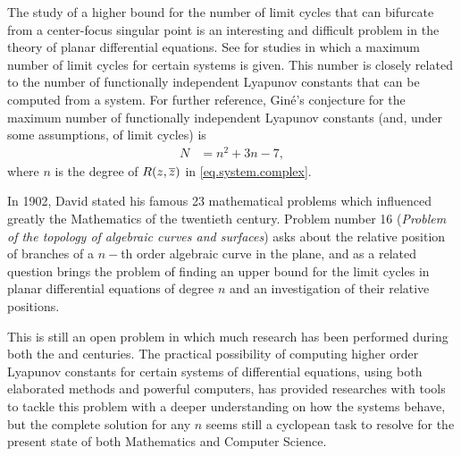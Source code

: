 The study of a higher bound for the number of limit cycles that can bifurcate from a center-focus singular point is an interesting and difficult problem in the theory of planar differential equations. See \textcite{Gine2007,Llibre2010} for studies in which a maximum number of limit cycles for certain systems is given. This number is closely related to the number of functionally independent Lyapunov constants that can be computed from a system. For further reference, Giné's conjecture for the maximum number of functionally independent Lyapunov constants (and, under some assumptions, of limit cycles) is
\begin{align}
N&=n^2+3n-7,
\label{eq.max-lyaps}
\end{align}
where $n$ is the degree of $R(z,\overline{z})$ in \eqref{eq.system.complex}.

In 1902, David \citeauthor{Hilbert1902} %
stated his famous 23 mathematical problems which influenced greatly the Mathematics of the twentieth century. Problem number 16 (\emph{Problem of the topology of algebraic curves and surfaces}) asks about the relative position of branches of a $n-$th order algebraic curve in the plane, and as a related question brings the problem of finding an upper bound for the limit cycles in planar differential equations of degree $n$ and an investigation of their relative positions.

This is still an open problem in which much research has been performed during both the  and  centuries. The practical possibility of computing higher order Lyapunov constants for certain systems of differential equations, using both elaborated methods and powerful computers, has provided researches with tools to tackle this problem with a deeper understanding on how the systems behave, but the complete solution for any $n$ seems still a cyclopean task to resolve for the present state of both Mathematics and Computer Science.


